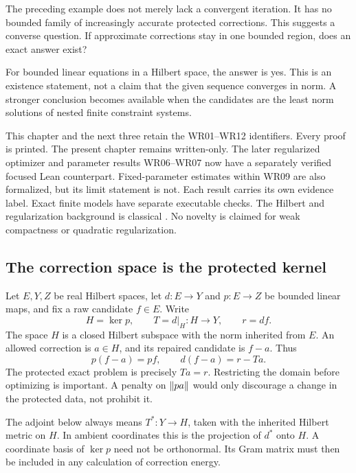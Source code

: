 \clearpage
{}\label{sec:bounded-realization}
The preceding example does not merely lack a convergent iteration. It has no bounded family of increasingly accurate protected corrections. This suggests a converse question. If approximate corrections stay in one bounded region, does an exact answer exist?

For bounded linear equations in a Hilbert space, the answer is yes. This is an existence statement, not a claim that the given sequence converges in norm. A stronger conclusion becomes available when the candidates are the least norm solutions of nested finite constraint systems.

\begin{scopebox}
This chapter and the next three retain the WR01--WR12 identifiers. Every proof is printed. The present chapter remains written-only. The later regularized optimizer and parameter results WR06--WR07 now have a separately verified focused Lean counterpart. Fixed-parameter estimates within WR09 are also formalized, but its limit statement is not. Each result carries its own evidence label. Exact finite models have separate executable checks. The Hilbert and regularization background is classical \cite{clason-inverse}. No novelty is claimed for weak compactness or quadratic regularization.
\end{scopebox}

\subsection{The correction space is the protected kernel}
Let $E,Y,Z$ be real Hilbert spaces, let $d:E\to Y$ and $p:E\to Z$ be bounded linear maps, and fix a raw candidate $f\in E$. Write
\[
 H=\ker p,\qquad T=d|_H:H\to Y,\qquad r=df.
\]
The space $H$ is a closed Hilbert subspace with the norm inherited from $E$. An allowed correction is $a\in H$, and its repaired candidate is $f-a$. Thus
\[
 p(f-a)=pf,\qquad d(f-a)=r-Ta.
\]
The protected exact problem is precisely $Ta=r$. Restricting the domain before optimizing is important. A penalty on $\left\lVert pa\right\rVert$ would only discourage a change in the protected data, not prohibit it.

The adjoint below always means $T^*:Y\to H$, taken with the inherited Hilbert metric on $H$. In ambient coordinates this is the projection of $d^*$ onto $H$. A coordinate basis of $\ker p$ need not be orthonormal. Its Gram matrix must then be included in any calculation of correction energy.

